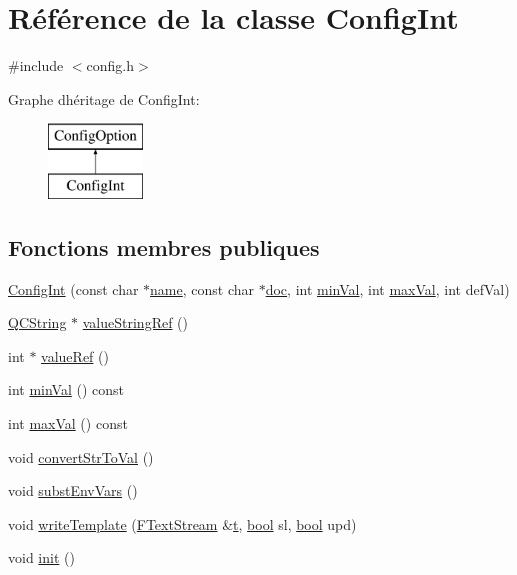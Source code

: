 \hypertarget{class_config_int}{}\section{Référence de la classe Config\+Int}
\label{class_config_int}


{\ttfamily \#include $<$config.\+h$>$}

Graphe d\textquotesingle{}héritage de Config\+Int\+:\begin{figure}[H]
\begin{center}
\leavevmode
\includegraphics[height=2.000000cm]{class_config_int}
\end{center}
\end{figure}
\subsection*{Fonctions membres publiques}
\begin{DoxyCompactItemize}
\item 
\hyperlink{class_config_int_a07aa951c7f1a25bc0eec264b74015fb9}{Config\+Int} (const char $\ast$\hyperlink{class_config_option_a2f226c32b0c447c1fa628660f42859c4}{name}, const char $\ast$\hyperlink{vhdljjparser_8cpp_a9910424bf5401d657c3b3fdff6fcc152}{doc}, int \hyperlink{class_config_int_ae4b735a2b36f1a9bea1937b7e5a05e6d}{min\+Val}, int \hyperlink{class_config_int_a65e129389120459570faccdef4ef1532}{max\+Val}, int def\+Val)
\item 
\hyperlink{class_q_c_string}{Q\+C\+String} $\ast$ \hyperlink{class_config_int_ae5592ee93881e4e45116f4b0533dc754}{value\+String\+Ref} ()
\item 
int $\ast$ \hyperlink{class_config_int_a35bd47ef87d178b694f29b168945afc0}{value\+Ref} ()
\item 
int \hyperlink{class_config_int_ae4b735a2b36f1a9bea1937b7e5a05e6d}{min\+Val} () const 
\item 
int \hyperlink{class_config_int_a65e129389120459570faccdef4ef1532}{max\+Val} () const 
\item 
void \hyperlink{class_config_int_ac4e9191ee5da6cef185c07dd686f94fb}{convert\+Str\+To\+Val} ()
\item 
void \hyperlink{class_config_int_a9c8052e1163a97d8d798b317c2eb1cbf}{subst\+Env\+Vars} ()
\item 
void \hyperlink{class_config_int_a2194c67246255b4106f70604c3bfb48d}{write\+Template} (\hyperlink{class_f_text_stream}{F\+Text\+Stream} \&\hyperlink{058__bracket__recursion_8tcl_a69e959f6901827e4d8271aeaa5fba0fc}{t}, \hyperlink{qglobal_8h_a1062901a7428fdd9c7f180f5e01ea056}{bool} sl, \hyperlink{qglobal_8h_a1062901a7428fdd9c7f180f5e01ea056}{bool} upd)
\item 
void \hyperlink{class_config_int_a20733b898775fb0b75c9a3e70662c3bf}{init} ()
\end{DoxyCompactItemize}
